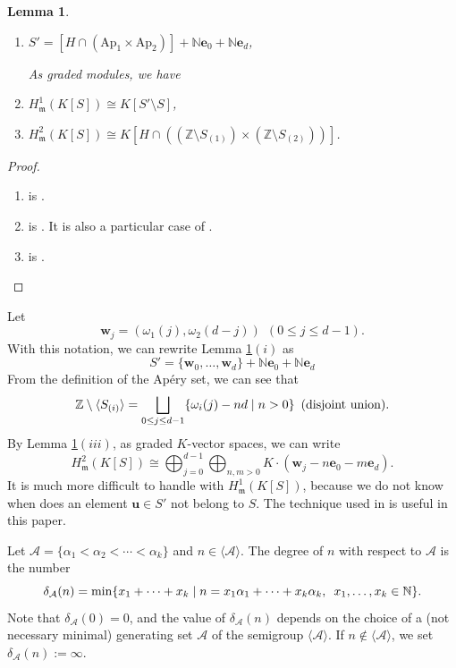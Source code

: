 \documentclass[11pt]{article}
\newtheorem{Lemma}[Theorem]{Lemma}
\def\mfr{{\frak m}}
\def\ebf{{\mathbf e}}
\def\ubf{{\mathbf u}}
\def\wbf{{\mathbf w}}
\def\mfr{{\mathfrak m}}
\def\Acal{{\mathcal A}}
\def\Zset{{\mathbb Z}}
\def\Nset{{\mathbb N}}
\theoremstyle{remark}
\theoremstyle{definition}
\begin{document}
\begin{Lemma} \label{A1}
\begin{enumerate}[\((i)\)]
    \item $S' = [ H \cap (\mathrm{Ap}_1 \times \mathrm{Ap}_2)] + \Nset\ebf_0 + \Nset \ebf_d$,

As graded modules, we have
\item $H^1_{\mfr} (K[S]) \cong K[S' \setminus S]$,
\item $H^2_{\mfr} (K[S]) \cong K[H \cap( (\Zset\setminus S_{(1)}) \times (\Zset\setminus S_{(2)})) ]$.
\end{enumerate}
\end{Lemma}

\begin{proof}
\begin{enumerate}[\((i)\)]
    \item is \cite[Lemma 2.4]{FH}.
    \item is  \cite[Lemma 2.6]{Br}. It is also a particular  case of \cite[Corollary 3.4]{TH}.
    \item is \cite[Lemma 2.6\((i)\)]{HeHS}.
\end{enumerate}
\end{proof}
Let
\begin{equation}\label{wec}
\wbf_j = (\omega_1(j), \omega_2(d-j)) \ \ (0\le j\le d-1).
\end{equation}
With this notation, we can rewrite Lemma \ref{A1}\((i)\) as
\begin{equation}\label{Ewec2}
S' = \{ \wbf_0,\ldots, \wbf_d\} + \Nset \ebf_0 + \Nset\ebf_d
\end{equation}
From the definition of the Ap\'ery set, we can see that
$$\Zset \setminus \langle S_{(i )}\rangle = \bigsqcup_{0\le j\le d-1}
 \{\omega_i(j) - nd\mid n> 0 \}\enskip\text{(disjoint union).}$$
By  Lemma \ref{A1}\((iii)\), as graded  $K$-vector spaces, we  can write
\begin{equation}\label{Eloco2} H^2_{\mfr} (K[S]) \cong  \bigoplus_{j=0}^{d-1}\bigoplus_{n,m>0} K\cdot(\wbf_j - n\ebf_0 - m\ebf_d).
\end{equation}
It is much more difficult to handle with $H^1_{\mfr} (K[S]) $, because we do not know when does an element $\ubf \in S'$ not belong to $S$. The technique used in \cite{Br, FH} is  useful in this paper. 

Let  $\Acal =\{\alpha_1< \alpha_2<\cdots <  \alpha_k\}$ and $n\in \langle \Acal \rangle$. The degree of $n$ with respect to 
$\Acal$ is the number
$$\delta_{\Acal} (n) = \min\{ x_1+ \cdots + x_k\mid n = x_1\alpha_1 + \cdots + x_k\alpha_k,\enskip x_1,\ldots,x_k \in \Nset\}.$$
Note that $\delta_{\Acal}(0) = 0$, and the value of $\delta_{\Acal}(n)$ depends on the choice of  a (not necessary minimal)  generating set $\Acal$ of the semigroup $ \langle \Acal \rangle$. If $n\not\in \langle \Acal \rangle$, we set $\delta_{\Acal}(n) := \infty$.
\end{document}
